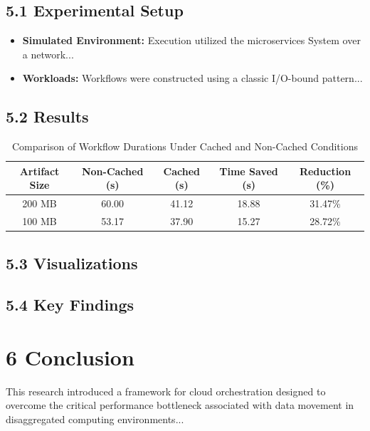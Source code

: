 \documentclass[12pt,a4paper]{report}
\begin{document}
\section*{5.1 Experimental Setup}
\begin{itemize}
    \item \textbf{Simulated Environment:} Execution utilized the microservices System over a network...
    \item \textbf{Workloads:} Workflows were constructed using a classic I/O-bound pattern...
\end{itemize}

\section*{5.2 Results}
\begin{table}[h]
\centering
\begin{tabular}{|c|c|c|c|c|}
\hline
\textbf{Artifact Size} & \textbf{Non-Cached (s)} & \textbf{Cached (s)} & \textbf{Time Saved (s)} & \textbf{Reduction (\%)} \\
\hline
200 MB & 60.00 & 41.12 & 18.88 & 31.47\% \\
\hline
100 MB & 53.17 & 37.90 & 15.27 & 28.72\% \\
\hline
\end{tabular}
\caption{Comparison of Workflow Durations Under Cached and Non-Cached Conditions}
\end{table}

\section*{5.3 Visualizations}
\section*{5.4 Key Findings}

\chapter{6 \hspace{0.2cm} Conclusion}
This research introduced a framework for cloud orchestration designed to overcome the critical performance bottleneck associated with data movement in disaggregated computing environments...
\end{document}
